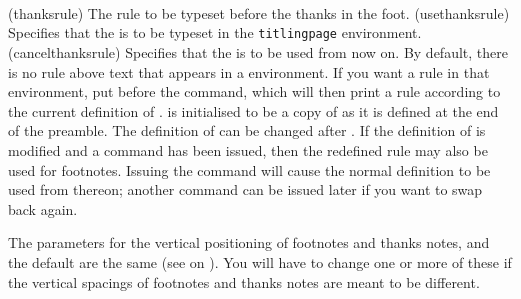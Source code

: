 \begin{syntax}
\cmd{\thanksrule} \\
\cmd{\usethanksrule} \\
\cmd{\cancelthanksrule} \\
\end{syntax}
\glossary(thanksrule)%
  {}%
  {The rule to be typeset before the thanks in the foot.}
\glossary(usethanksrule)%
  {}%
  {Specifies that the  is to be typeset in the 
   \texttt{titlingpage} environment.}
\glossary(cancelthanksrule)%
  {}%
  {Specifies that the  is to be used from now on.}
By default, there is no rule above \cmd{\thanks}
text that appears in a  environment.
If you want a rule in that environment, put \cmd{\usethanksrule} 
before the \cmd{\maketitle} command, which will then print a rule according
to the current definition of \cmd{\thanksrule}.
\cmd{\thanksrule} is initialised to be a copy of \cmd{\footnoterule} as it 
is defined at the
end of the preamble. The definition of \cmd{\thanksrule} can be changed
after \verb??. If the definition of \cmd{\thanksrule} is modified
and a \cmd{\usethanksrule} command has been issued, then the redefined
rule may also be used for footnotes. Issuing the command 
\cmd{\cancelthanksrule} will cause the normal \cmd{\footnoterule} definition
to be used from thereon; another \cmd{\usethanksrule}
command can be issued later
if you want to swap back again.

The parameters for the vertical positioning of footnotes 
and thanks notes, and the default \cmd{\footnoterule} are the same
(see  on ).
You will have to change one or more of these if the vertical spacings of 
footnotes
and thanks notes are meant to be different.



